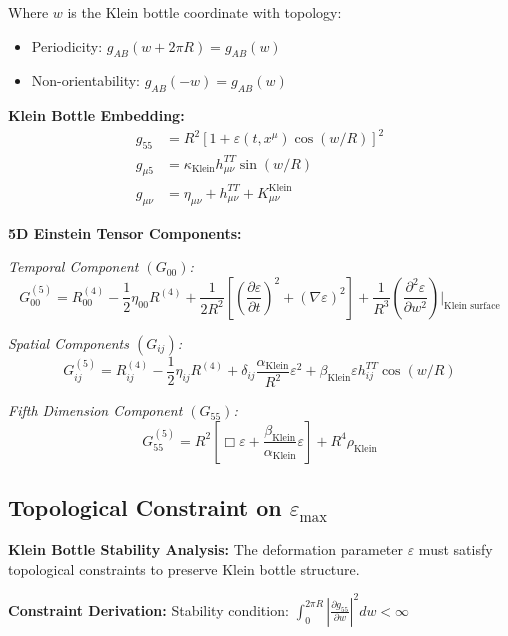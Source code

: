 \documentclass[12pt,a4paper]{article}
\newcommand{\epsilonmax}{\varepsilon_{\text{max}}}
\newcommand{\Klein}{\text{Klein}}
\begin{document}
Where $w$ is the Klein bottle coordinate with topology:
\begin{itemize}
    \item Periodicity: $g_{AB}(w + 2\pi R) = g_{AB}(w)$
    \item Non-orientability: $g_{AB}(-w) = g_{AB}(w)$
\end{itemize}

\textbf{Klein Bottle Embedding:}
\begin{align}
g_{55} &= R^2[1 + \varepsilon(t, x^\mu) \cos(w/R)]^2 \\
g_{\mu 5} &= \kappa_{\Klein} h_{\mu\nu}^{TT} \sin(w/R) \\
g_{\mu\nu} &= \eta_{\mu\nu} + h_{\mu\nu}^{TT} + K_{\mu\nu}^{\Klein}
\end{align}

\textbf{5D Einstein Tensor Components:}

\textit{Temporal Component $(G_{00})$:}
\begin{equation}
G_{00}^{(5)} = R_{00}^{(4)} - \frac{1}{2}\eta_{00}R^{(4)} + \frac{1}{2R^2}\left[\left(\frac{\partial\varepsilon}{\partial t}\right)^2 + (\nabla\varepsilon)^2\right] + \frac{1}{R^3}\left(\frac{\partial^2\varepsilon}{\partial w^2}\right)\bigg|_{\Klein \text{ surface}}
\end{equation}

\textit{Spatial Components $(G_{ij})$:}
\begin{equation}
G_{ij}^{(5)} = R_{ij}^{(4)} - \frac{1}{2}\eta_{ij} R^{(4)} + \delta_{ij}\frac{\alpha_{\Klein}}{R^2}\varepsilon^2 + \beta_{\Klein} \varepsilon h_{ij}^{TT} \cos(w/R)
\end{equation}

\textit{Fifth Dimension Component $(G_{55})$:}
\begin{equation}
G_{55}^{(5)} = R^2\left[\Box\varepsilon + \frac{\beta_{\Klein}}{\alpha_{\Klein}}\varepsilon\right] + R^4\rho_{\Klein}
\end{equation}

\subsection{Topological Constraint on $\epsilonmax$}

\textbf{Klein Bottle Stability Analysis:}
The deformation parameter $\varepsilon$ must satisfy topological constraints to preserve Klein bottle structure.

\textbf{Constraint Derivation:}
Stability condition: $\int_0^{2\pi R} \left|\frac{\partial g_{55}}{\partial w}\right|^2 dw < \infty$
\end{document}

